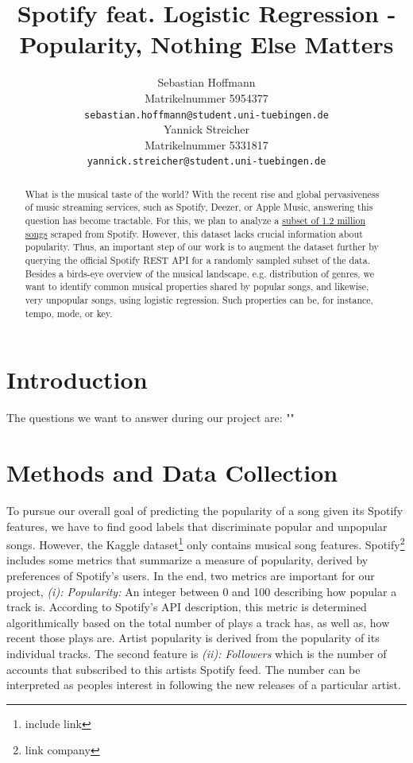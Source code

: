 \documentclass{article}
\title{Spotify feat. Logistic Regression - \\ Popularity, Nothing Else Matters}
\author{%
  Sebastian Hoffmann\\
  Matrikelnummer 5954377\\
  \texttt{sebastian.hoffmann@student.uni-tuebingen.de} \\
  \And
  Yannick Streicher\\
  Matrikelnummer 5331817\\
  \texttt{yannick.streicher@student.uni-tuebingen.de} \\
}
\begin{document}
\maketitle

\begin{abstract}
  What is the musical taste of the world? With the recent rise and global pervasiveness of music streaming services, such as Spotify, Deezer, or Apple Music, answering this question has become tractable. For this, we plan to analyze a \href{https://www.kaggle.com/rodolfofigueroa/spotify-12m-songs}{subset of 1.2 million songs} scraped from Spotify. However, this dataset lacks crucial information about popularity. Thus, an important step of our work is to augment the dataset further by querying the official Spotify REST API for a randomly sampled subset of the data. Besides a birds-eye overview of the musical landscape, e.g. distribution of genres, we want to identify common musical properties shared by popular songs, and likewise, very unpopular songs, using logistic regression. Such properties can be, for instance, tempo, mode, or key.
\end{abstract}

\section{Introduction}
The questions we want to answer during our project are: ""

\section{Methods and Data Collection}
To pursue our overall goal of predicting the popularity of a song given its Spotify features, we have to find good labels that discriminate popular and unpopular songs. However, the Kaggle dataset\footnote{include link} only contains musical song features. Spotify\footnote{link company} includes some metrics that summarize a measure of popularity, derived by preferences of Spotify's users. In the end, two metrics are important for our project, \textit{(i): Popularity:} An integer between 0 and 100 describing how popular a track is. According to Spotify's API description, this metric is determined algorithmically based on the total number of plays a track has, as well as, how recent those plays are. Artist popularity is derived from the popularity of its individual tracks. The second feature is \textit{(ii): Followers} which is the number of accounts that subscribed to this artists Spotify feed. The number can be interpreted as peoples interest in following the new releases of a particular artist.
\end{document}
